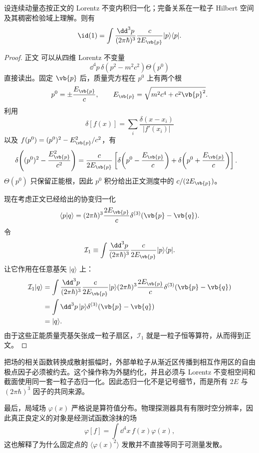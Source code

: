 \begin{proposition}[连续一粒子态的完备测度]
设连续动量态按正文的 Lorentz 不变内积归一化；完备关系在一粒子 Hilbert 空间及其稠密检验域上理解。则有
\begin{equation}
{
\id(1)
=\int\frac{\dd^3 p}{(2\pi\hbar)^3}\frac{c}{2E_{\vb{p}}}
|p\rangle\langle p|.}
\label{eq:one-particle-completeness-r2}
\end{equation}
\end{proposition}
\begin{proof}
正文 可以从四维 Lorentz 不变量
\[
\dd^4 p\,\delta(p^2-m^2c^2)\Theta(p^0)
\]
直接读出。固定 $\vb{p}$ 后，质量壳方程在 $p^0$ 上有两个根
\[
p^0=\pm\frac{E_{\vb{p}}}{c},
\qquad
E_{\vb{p}}=\sqrt{m^2c^4+c^2\vb{p}^2}.
\]
利用
\[
\delta[f(x)]=\sum_i\frac{\delta(x-x_i)}{|f'(x_i)|}
\]
以及 $f(p^0)=(p^0)^2-E_{\vb{p}}^2/c^2$，有
\begin{align*}
\delta\!\left((p^0)^2-\frac{E_{\vb{p}}^2}{c^2}\right)
&=\frac{c}{2E_{\vb{p}}}
\left[
\delta\!\left(p^0-\frac{E_{\vb{p}}}c\right)
+\delta\!\left(p^0+\frac{E_{\vb{p}}}c\right)
\right].
\end{align*}
$\Theta(p^0)$ 只保留正能根，因此 $p^0$ 积分给出正文测度中的 $c/(2E_{\vb{p}})$。

现在考虑正文已经给出的协变归一化
\[
\langle p|q\rangle
=(2\pi\hbar)^3\frac{2E_{\vb{p}}}{c}
\delta^{(3)}(\vb{p}-\vb{q}).
\]
令
\[
\mathcal I_1
\equiv
\int\frac{\dd^3 p}{(2\pi\hbar)^3}
\frac{c}{2E_{\vb{p}}}|p\rangle\langle p|.
\]
让它作用在任意基矢 $|q\rangle$ 上：
\begin{align*}
\mathcal I_1|q\rangle
&=\int\frac{\dd^3 p}{(2\pi\hbar)^3}
\frac{c}{2E_{\vb{p}}}|p\rangle
(2\pi\hbar)^3\frac{2E_{\vb{p}}}c
\delta^{(3)}(\vb{p}-\vb{q})\\
&=\int\dd^3 p\,|p\rangle
\delta^{(3)}(\vb{p}-\vb{q})\\
&=|q\rangle.
\end{align*}
由于这些正能质量壳基矢张成一粒子扇区，$\mathcal I_1$ 就是一粒子恒等算符，从而得到正文。
\end{proof}

把场的相关函数转换成散射振幅时，外部单粒子从渐近区传播到相互作用区的自由极点因子必须被约去。这个操作称为外腿约化，并且必须与 Lorentz 不变相空间和截面使用同一套一粒子态归一化。因此态归一化不是记号细节，而是所有 $2E$ 与 $(2\pi\hbar)^3$ 因子的共同来源。

最后，局域场 $\varphi(x)$ 严格说是算符值分布。物理探测器具有有限时空分辨率，因此真正良定义的对象是经测试函数涂抹的场
\begin{equation*}
\varphi[f]=\int \dd^4 x\,f(x)\varphi(x),
\end{equation*}
这也解释了为什么固定点的 $\langle\varphi(x)^2\rangle$ 发散并不直接等同于可测量发散。


